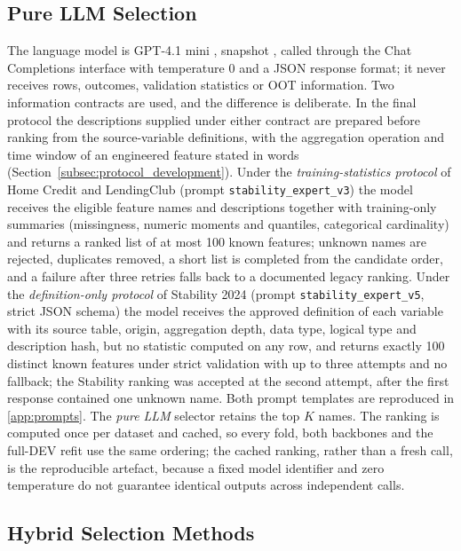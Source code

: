 \documentclass[final,5p,twocolumn]{elsarticle}
\newcommand{\Kfeat}{K}
\begin{document}
\subsection{Pure LLM Selection}
\label{subsec:llm_fs}

The language model is GPT-4.1 mini \cite{openai2025gpt41}, snapshot , called through the Chat Completions interface with temperature 0 and a JSON response format; it never receives rows, outcomes, validation statistics or OOT information. Two information contracts are used, and the difference is deliberate. In the final protocol the descriptions supplied under either contract are prepared before ranking from the source-variable definitions, with the aggregation operation and time window of an engineered feature stated in words (Section~\ref{subsec:protocol_development}). Under the \emph{training-statistics protocol} of Home Credit and LendingClub (prompt \texttt{stability\_expert\_v3}) the model receives the eligible feature names and descriptions together with training-only summaries (missingness, numeric moments and quantiles, categorical cardinality) and returns a ranked list of at most 100 known features; unknown names are rejected, duplicates removed, a short list is completed from the candidate order, and a failure after three retries falls back to a documented legacy ranking. Under the \emph{definition-only protocol} of Stability 2024 (prompt \texttt{stability\_expert\_v5}, strict JSON schema) the model receives the approved definition of each variable with its source table, origin, aggregation depth, data type, logical type and description hash, but no statistic computed on any row, and returns exactly 100 distinct known features under strict validation with up to three attempts and no fallback; the Stability ranking was accepted at the second attempt, after the first response contained one unknown name. Both prompt templates are reproduced in \ref{app:prompts}. The \emph{pure LLM} selector retains the top $\Kfeat$ names. The ranking is computed once per dataset and cached, so every fold, both backbones and the full-DEV refit use the same ordering; the cached ranking, rather than a fresh call, is the reproducible artefact, because a fixed model identifier and zero temperature do not guarantee identical outputs across independent calls.

\subsection{Hybrid Selection Methods}
\label{subsec:hybrid_fs}
\end{document}
